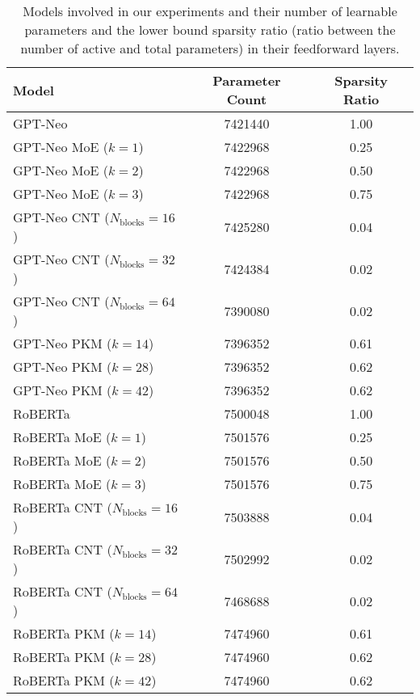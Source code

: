 \begin{table}[h]

\centering
\caption{Models involved in our experiments and their number of learnable parameters and the lower bound sparsity ratio (ratio between the number of active and total parameters) in their feedforward layers.}
\label{tab:mode-size}
\tiny
\begin{tabular}{lcc}
\toprule
\textbf{Model} & \textbf{Parameter Count} & \textbf{Sparsity Ratio} \\
\midrule
GPT-Neo & 7421440 & 1.00 \\
GPT-Neo MoE ($k=1$) & 7422968 & 0.25 \\
GPT-Neo MoE ($k=2$) & 7422968 & 0.50 \\
GPT-Neo MoE ($k=3$) & 7422968 & 0.75\\
GPT-Neo CNT ($N_\text{blocks}=16$) & 7425280 & 0.04\\
GPT-Neo CNT ($N_\text{blocks}=32$) & 7424384 & 0.02\\
GPT-Neo CNT ($N_\text{blocks}=64$) & 7390080 & 0.02 \\
GPT-Neo PKM ($k=14$) & 7396352 & 0.61 \\
GPT-Neo PKM ($k=28$) & 7396352 & 0.62 \\
GPT-Neo PKM ($k=42$) & 7396352 & 0.62 \\
\midrule
RoBERTa & 7500048 & 1.00 \\
RoBERTa MoE ($k=1$) & 7501576 & 0.25 \\
RoBERTa MoE ($k=2$) & 7501576 & 0.50 \\
RoBERTa MoE ($k=3$) & 7501576 & 0.75 \\
RoBERTa CNT ($N_\text{blocks}=16$) & 7503888 & 0.04\\
RoBERTa CNT ($N_\text{blocks}=32$) & 7502992 & 0.02\\
RoBERTa CNT ($N_\text{blocks}=64$) & 7468688 & 0.02\\
RoBERTa PKM ($k=14$) & 7474960 & 0.61 \\
RoBERTa PKM ($k=28$) & 7474960 & 0.62 \\
RoBERTa PKM ($k=42$) & 7474960 & 0.62 \\
\bottomrule
\end{tabular}
\end{table}

